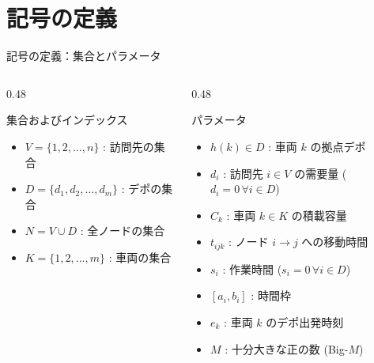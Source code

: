 \documentclass[aspectratio=169,11pt]{beamer}
\begin{document}
\section{記号の定義}

\begin{frame}{記号の定義：集合とパラメータ}
  \small
  \begin{columns}[T]
    \begin{column}{0.48\textwidth}
      \begin{block}{集合およびインデックス}
        \begin{itemize}
          \item $V = \{1, 2, \dots, n\}$ : 訪問先の集合
          \item $D = \{d_1, d_2, \dots, d_m\}$ : デポの集合
          \item $N = V \cup D$ : 全ノードの集合
          \item $K = \{1, 2, \dots, m\}$ : 車両の集合
        \end{itemize}
      \end{block}
    \end{column}
    \begin{column}{0.48\textwidth}
      \begin{block}{パラメータ}
        \begin{itemize}
          \item $h(k) \in D$ : 車両 $k$ の拠点デポ
          \item $d_i$ : 訪問先 $i \in V$ の需要量 ($d_i=0 \, \forall i \in D$)
          \item $C_k$ : 車両 $k \in K$ の積載容量
          \item $t_{ijk}$ : ノード $i \to j$ への移動時間
          \item $s_i$ : 作業時間 ($s_i=0 \, \forall i \in D$)
          \item $[a_i, b_i]$ : 時間枠
          \item $e_k$ : 車両 $k$ のデポ出発時刻
          \item $M$ : 十分大きな正の数 (Big-$M$)
        \end{itemize}
      \end{block}
    \end{column}
  \end{columns}
\end{frame}
\end{document}
